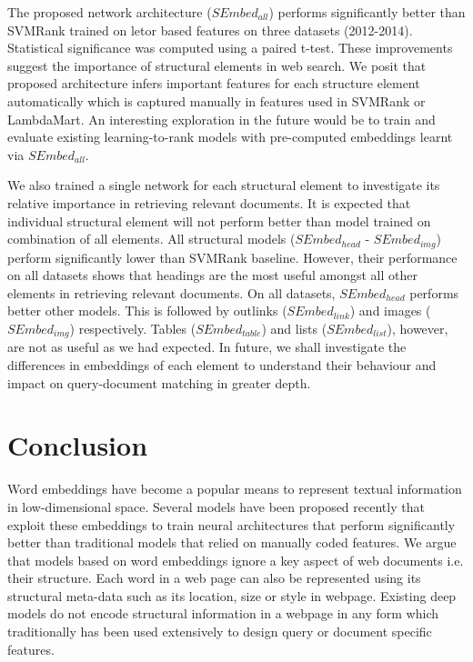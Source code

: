 \documentclass[runningheads,a4paper]{llncs}
\begin{document}
The proposed network architecture ($SEmbed_{all}$) performs significantly better than 
SVMRank trained on letor based features 
on three datasets (2012-2014). Statistical significance was computed using a paired t-test. 
These improvements suggest the importance of structural elements in web search. 
We posit that proposed architecture infers important features for each structure element automatically 
which is captured manually in features used in SVMRank or LambdaMart. 
An interesting exploration in the future would be to train and evaluate existing 
learning-to-rank models with pre-computed embeddings learnt via $SEmbed_{all}$.

We also trained a single network for each structural element to investigate  
its relative importance in retrieving relevant documents. It is expected that 
individual structural element will not perform better than model trained on 
combination of all elements. All structural models ($SEmbed_{head}$ - $SEmbed_{img}$) 
perform significantly lower than SVMRank baseline. 
However, their performance on all datasets shows that headings are the most useful amongst 
all other elements in retrieving relevant documents. On all datasets, 
$SEmbed_{head}$ performs better other models. 
This is followed by outlinks ($SEmbed_{link}$) and images ($SEmbed_{img}$) respectively. 
Tables ($SEmbed_{table}$) and lists ($SEmbed_{list}$), however, are not as useful as we had expected.
In future, we shall investigate the differences in embeddings of each element 
to understand their behaviour and impact on query-document matching in greater depth. 




\section{Conclusion}
\label{sec:conclusion}
Word embeddings have become a popular means to represent textual information in low-dimensional space. 
Several models have been proposed recently that exploit these embeddings to train neural architectures 
that perform significantly better than traditional models that relied on manually coded features. 
We argue that models based on word embeddings ignore a key aspect of web documents i.e. their structure. 
Each word in a web page can also be represented using its structural meta-data such as its location, size or 
style in webpage. Existing deep models do not encode structural information in a webpage in any form which 
traditionally has been used extensively to design query or document specific features. 
\end{document}
